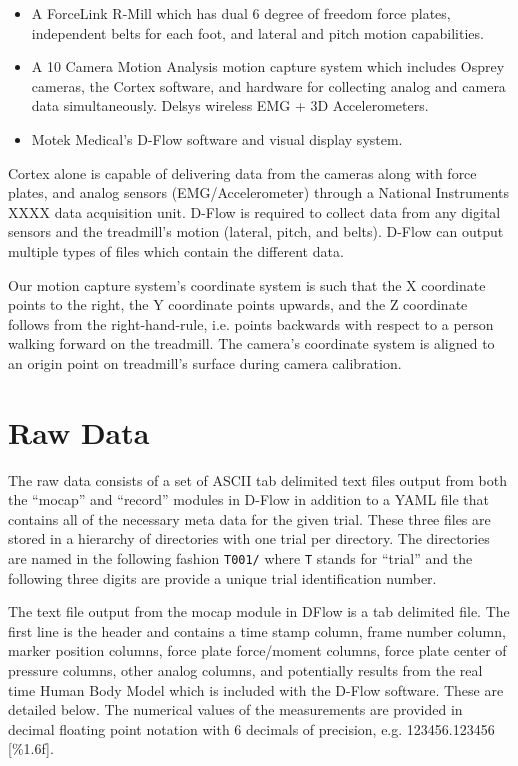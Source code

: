 \documentclass{article}
\begin{document}
\begin{itemize}
  \item A ForceLink R-Mill which has dual 6 degree of freedom force plates,
    independent belts for each foot, and lateral and pitch motion capabilities.
  \item A 10 Camera Motion Analysis motion capture system which includes Osprey
    cameras, the Cortex software, and hardware for collecting analog and camera
    data simultaneously. Delsys wireless EMG + 3D Accelerometers.
  \item Motek Medical’s D-Flow software and visual display system.
\end{itemize}

Cortex alone is capable of delivering data from the cameras along with force
plates, and analog sensors (EMG/Accelerometer) through a National Instruments
XXXX data acquisition unit. D-Flow is required to collect data from any digital
sensors and the treadmill's motion (lateral, pitch, and belts). D-Flow can
output multiple types of files which contain the different data.

Our motion capture system's coordinate system is such that the X coordinate
points to the right, the Y coordinate points upwards, and the Z coordinate
follows from the right-hand-rule, i.e. points backwards with respect to a
person walking forward on the treadmill. The camera's coordinate system is
aligned to an origin point on treadmill's surface during camera calibration.

\section{Raw Data}
%
The raw data consists of a set of ASCII tab delimited text files output from
both the ``mocap'' and ``record'' modules in D-Flow in addition to a YAML file
that contains all of the necessary meta data for the given trial. These three
files are stored in a hierarchy of directories with one trial per directory.
The directories are named in the following fashion \verb+T001/+ where \verb+T+
stands for ``trial'' and the following three digits are provide a unique trial
identification number.

The text file output from the mocap module in DFlow is a tab delimited file.
The first line is the header and contains a time stamp column, frame number
column, marker position columns, force plate force/moment columns, force plate
center of pressure columns, other analog columns, and potentially results from
the real time Human Body Model \cite{Bogert2013} which is included with the
D-Flow software. These are detailed below. The numerical values of the
measurements are provided in decimal floating point notation with 6 decimals of
precision, e.g. 123456.123456 [\%1.6f].
\end{document}
